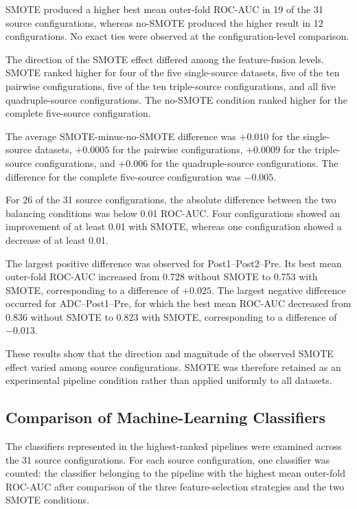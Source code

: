 \documentclass[12pt,twocolumn]{article}
\begin{document}
SMOTE produced a higher best mean outer-fold ROC-AUC in 19 of the 31
source configurations, whereas no-SMOTE produced the higher result in
12 configurations. No exact ties were observed at the
configuration-level comparison.

The direction of the SMOTE effect differed among the feature-fusion
levels. SMOTE ranked higher for four of the five single-source
datasets, five of the ten pairwise configurations, five of the ten
triple-source configurations, and all five quadruple-source
configurations. The no-SMOTE condition ranked higher for the complete
five-source configuration.

The average SMOTE-minus-no-SMOTE difference was \(+0.010\) for the
single-source datasets, \(+0.0005\) for the pairwise configurations,
\(+0.0009\) for the triple-source configurations, and \(+0.006\) for
the quadruple-source configurations. The difference for the complete
five-source configuration was \(-0.005\).

For 26 of the 31 source configurations, the absolute difference
between the two balancing conditions was below 0.01 ROC-AUC. Four
configurations showed an improvement of at least 0.01 with SMOTE,
whereas one configuration showed a decrease of at least 0.01.

The largest positive difference was observed for
Post1--Post2--Pre. Its best mean outer-fold ROC-AUC increased from
0.728 without SMOTE to 0.753 with SMOTE, corresponding to a
difference of \(+0.025\). The largest negative difference occurred
for ADC--Post1--Pre, for which the best mean ROC-AUC decreased from
0.836 without SMOTE to 0.823 with SMOTE, corresponding to a
difference of \(-0.013\).

These results show that the direction and magnitude of the observed
SMOTE effect varied among source configurations. SMOTE was therefore
retained as an experimental pipeline condition rather than applied
uniformly to all datasets.








\subsection{Comparison of Machine-Learning Classifiers}
\label{subsec:classifier_results}

The classifiers represented in the highest-ranked pipelines were
examined across the 31 source configurations. For each source
configuration, one classifier was counted: the classifier belonging
to the pipeline with the highest mean outer-fold ROC-AUC after
comparison of the three feature-selection strategies and the two
SMOTE conditions.
\end{document}
